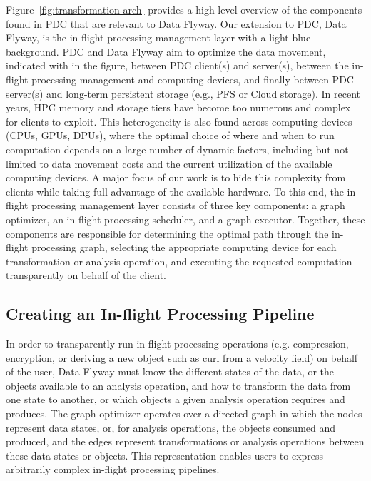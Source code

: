 Figure~\ref{fig:transformation-arch} provides a high-level overview of the components found in PDC that are relevant to Data Flyway. Our extension to PDC, Data Flyway, is the in-flight processing management layer with a light blue background. PDC and Data Flyway aim to optimize the data movement, indicated with  in the figure, between PDC client(s) and server(s), between the in-flight processing management and computing devices, and finally between PDC server(s) and long-term persistent storage (e.g., PFS or Cloud storage). In recent years, HPC memory and storage tiers have become too numerous and complex for clients to exploit. This heterogeneity is also found across computing devices (CPUs, GPUs, DPUs), where the optimal choice of where and when to run computation depends on a large number of dynamic factors, including but not limited to data movement costs and the current utilization of the available computing devices. A major focus of our work is to hide this complexity from clients while taking full advantage of the available hardware. To this end, the in-flight processing management layer consists of three key components: a graph optimizer, an in-flight processing scheduler, and a graph executor. Together, these components are responsible for determining the optimal path through the in-flight processing graph, selecting the appropriate computing device for each transformation or analysis operation, and executing the requested computation transparently on behalf of the client.

\subsection{Creating an In-flight Processing Pipeline}
\label{sec:pipeline}

In order to transparently run in-flight processing operations (e.g. compression, encryption, or deriving a new object such as curl from a velocity field) on behalf of the user, Data Flyway must know the different states of the data, or the objects available to an analysis operation, and how to transform the data from one state to another, or which objects a given analysis operation requires and produces. The graph optimizer operates over a directed graph in which the nodes represent data states, or, for analysis operations, the objects consumed and produced, and the edges represent transformations or analysis operations between these data states or objects. This representation enables users to express arbitrarily complex in-flight processing pipelines.

